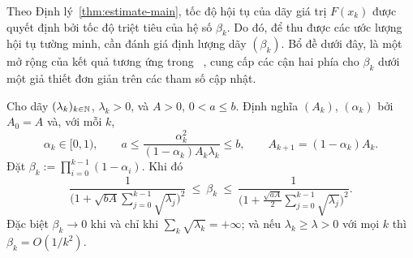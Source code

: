 \begin{essayonly}
Theo Định lý~\ref{thm:estimate-main}, tốc độ hội tụ của dãy giá trị $F(x_k)$ được quyết định bởi tốc độ triệt tiêu của hệ số $\beta_k$. Do đó, để thu được các ước lượng hội tụ tường minh, cần đánh giá định lượng dãy $(\beta_k)$. Bổ đề dưới đây, là một mở rộng của kết quả tương ứng trong ~\citep{guler1992}, cung cấp các cận hai phía cho $\beta_k$ dưới một giả thiết đơn giản trên các tham số cập nhật.
\end{essayonly}

\begin{lemma}
\label{lem:beta-rate}
Cho dãy $(\lambda_k)_{k\in\mathbb{N}}$, $\lambda_k>0$, và $A>0$, $0<a\le b$. Định nghĩa $(A_k)$, $(\alpha_k)$ bởi $A_0=A$ và, với mỗi $k$,
\[
  \alpha_k\in[0,1),\qquad
  a \le \frac{\alpha_k^2}{(1-\alpha_k)A_k\lambda_k} \le b,
  \qquad A_{k+1}=(1-\alpha_k)A_k.
\]
Đặt $\beta_k:=\prod_{i=0}^{k-1}(1-\alpha_i)$. Khi đó
\begin{equation}
  \frac{1}{\Big(1+\sqrt{bA}\sum_{j=0}^{k-1}\sqrt{\lambda_j}\Big)^2}
  \ \le\ \beta_k \ \le\
  \frac{1}{\Big(1+\tfrac{\sqrt{aA}}2\sum_{j=0}^{k-1}\sqrt{\lambda_j}\Big)^2}.
  \label{eq:beta-bound}
\end{equation}
Đặc biệt $\beta_k\to0$ khi và chỉ khi $\sum_k\sqrt{\lambda_k}=+\infty$; và
nếu $\lambda_k\ge\lambda>0$ với mọi $k$ thì $\beta_k=O(1/k^2)$.
\end{lemma}
